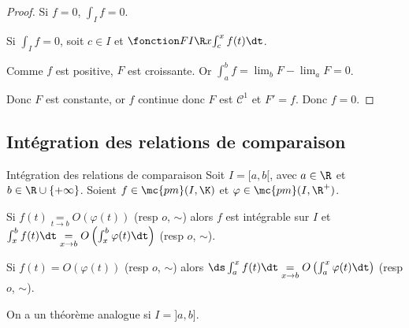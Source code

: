 \begin{proof}
    Si $f = 0$, $\int_I f = 0$.

    Si $\int_{I } f = 0$, soit $c \in I$ et $\fonction F I \R x {\int_c^x f(t) \dt}$.

    Comme $f$ est positive, $F$ est croissante. Or $\int_{a }^{b } f = \lim_b F - \lim_a F = 0$. 

    Donc $F$ est constante, or $f$ continue donc $F$ est $\mathscr C^1$ et $F' = f$. Donc 
    $f = 0$.
\end{proof}


\subsection{Intégration des relations de comparaison}

\begin{theoreme}{Intégration des relations de comparaison}{}
    Soit $I = [a,b[$, avec $a \in \R$ et $b \in \R \cup \{+\infty\}$. 
    Soient $f \in \mc {pm} (I, \K)$ et $\varphi \in \mc {pm}(I, \R^+)$.

    
    \svspace Si $f(t) \underset{t \to b }{=} O(\varphi(t))$ (resp $o$, $\sim$) alors $f$ est intégrable sur $I$ 
    et $\int_x^b f(t) \dt \underset{x \to b }{=} O\left( \int_x^b \varphi(t) \dt \right)$ (resp $o$, $\sim$).


    \svspace Si $f(t) = O(\varphi(t))$ (resp $o$, $\sim$) alors 
    $\ds \int_{a }^{x } f(t) \dt \underset{x \to b }{=} O\left( \int_{a }^{x } \varphi(t) \dt \right)$ (resp $o$, $\sim$).
\end{theoreme}

\begin{remarque}
    On a un théorème analogue si $I = ]a, b]$. 
\end{remarque}

